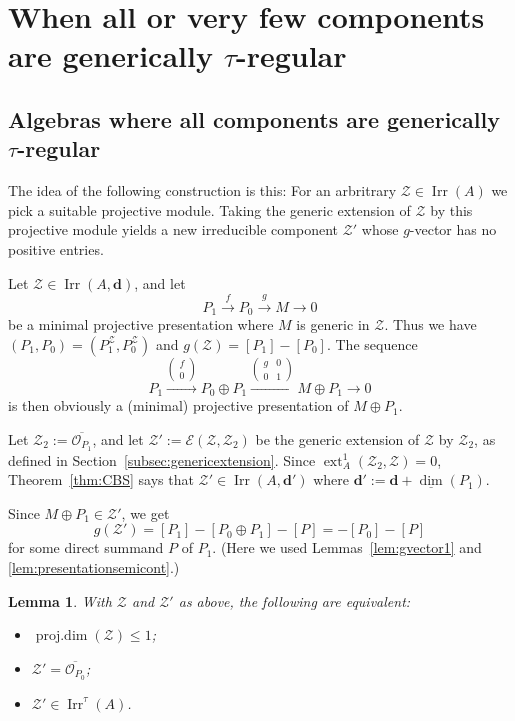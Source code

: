 \documentclass[12pt,reqno]{amsart}
\newtheorem{Lem}[Thm]{Lemma}
\theoremstyle{definition}
\newcommand{\cE}{{\mathcal E}}
\newcommand{\cO}{{\mathcal O}}
\newcommand{\bd}{\mathbf{d}}
\newcommand{\pdim}{\operatorname{proj.dim}}
\newcommand{\dimv}{\underline{\dim}}
\newcommand{\ext}{\operatorname{ext}}
\newcommand{\irr}{\operatorname{Irr}}
\newcommand{\bsm}{\begin{smallmatrix}}
\newcommand{\esm}{\end{smallmatrix}}
\newcommand{\calZ}{\mathcal{Z}}
\begin{document}

\section{When all or very few components are generically $\tau$-regular}\label{sec:alltaureg}



\subsection{Algebras where all components are generically
$\tau$-regular}\label{subsec:alltaureg}
The idea of the following construction is this:
For an arbritrary $\calZ \in \irr(A)$ we pick a suitable
projective module.
Taking  the generic extension of $\calZ$ by this projective module yields a
new irreducible component $\calZ'$ whose $g$-vector has no positive entries.

Let $\calZ \in \irr(A,\bd)$, and let
$$
P_1 \xrightarrow{f} P_0 \xrightarrow{g} M \to 0
$$
be a minimal projective presentation where $M$ is generic in $\calZ$.
Thus we have $(P_1,P_0) = (P_1^{\calZ},P_0^{\calZ})$ and
$g(\calZ) = [P_1] - [P_0]$.
The sequence
$$
P_1 \xrightarrow{\left(\bsm f\\0\esm\right)}
P_0 \oplus P_1
\xrightarrow{\left(\bsm g&0\\0&1\esm\right)} M \oplus P_1 \to 0
$$
is then obviously a (minimal) projective presentation of
$M \oplus P_1$.

Let $\calZ_2 := \overline{\cO_{P_1}}$, and let
$\calZ' := \cE(\calZ,\calZ_2)$ be the generic extension of
$\calZ$ by $\calZ_2$, as defined in Section~\ref{subsec:genericextension}.
Since $\ext_A^1(\calZ_2,\calZ) = 0$, Theorem~\ref{thm:CBS}
says that
$\calZ' \in \irr(A,\bd')$ where
$\bd' := \bd + \dimv(P_1)$.

Since $M \oplus P_1 \in \calZ'$, we get
$$
g(\calZ') = [P_1] - [P_0 \oplus P_1] - [P] = -[P_0] - [P]
$$
for some direct summand $P$ of $P_1$.
(Here we used Lemmas~\ref{lem:gvector1} and  \ref{lem:presentationsemicont}.)


\begin{Lem}\label{lem:alltaureg}
With $\calZ$ and $\calZ'$ as above, the following are equivalent:
\begin{itemize}\itemsep2mm

\item[(i)]
$\pdim(\calZ) \le 1$;

\item[(ii)]
$\calZ' = \overline{\cO_{P_0}}$;

\item[(iii)]
$\calZ' \in \irr^\tau(A)$.

\end{itemize}
\end{Lem}
\end{document}
